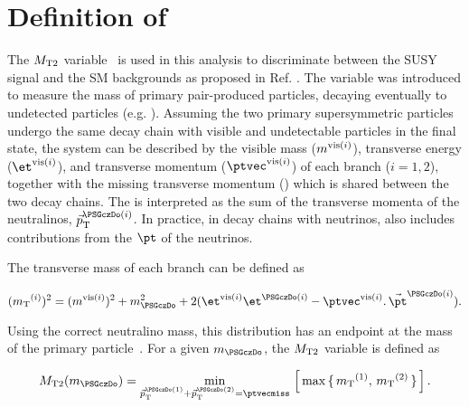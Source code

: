 \section{\texorpdfstring{Definition of \mttwo}{Definition of MT2}}
\label{sect:mt2def}
The ${M_{\rm T2}}$ variable~\cite{Lester:1999tx,Barr:2003rg} is used in this analysis to discriminate between the SUSY signal and the SM backgrounds as proposed in Ref. \cite{Barr:2009wu}. The variable was introduced to measure the mass of primary pair-produced particles, decaying eventually to undetected particles (e.g. \PSGczDo). Assuming the two primary supersymmetric particles undergo the same decay chain with visible and undetectable particles in the final state, the system can be described by the visible mass ($m^{{\rm vis}(i)}$), transverse energy ($\etvisi$), and transverse momentum ($\vptvisi$) of each branch ($i=1,2$), together with the 
missing transverse momentum (\ptvecmiss) which is shared between the two decay chains. The \ptvecmiss is interpreted as the sum of the transverse momenta
of the neutralinos, $\vec{p}_{\rm T}^{\PSGczDo(i)}$.
In practice, in decay chains with neutrinos, \ptvecmiss also includes contributions from the $\pt$ of the neutrinos.

The transverse mass of each branch can be defined as 
\begin{linenomath}
\begin{equation}
\label{eq:mtdef}
(\mt^{(i)})^{2}= (\mvisi)^2+m^2_{\PSGczDo}+2(\etvisi\et^{\PSGczDo(i)}-{\vptvisi}.\,{\vec{\pt}^{\PSGczDo(i)}}).
\end{equation}
\end{linenomath}

\noindent Using the correct neutralino mass, this distribution has an endpoint at the mass of the primary particle~\cite{Arnison:1983rp,Banner:1983jy,Affolder:2000bpa,Abazov:2002bu}. 
For a given $m_{\PSGczDo}$, the ${M_{\rm T2}}$ variable is defined as
\begin{linenomath}
\begin{equation}
\label{eq:mt2def}
\mttwo(m_{\PSGczDo})= \min_{\vec{p}_{\rm T}^{\PSGczDo(1)}+\vec{p}_{\rm T}^{\PSGczDo(2)}=\ptvecmiss}\,\left[\,\max\,\{ \, \mt^{(1)},\,\mt^{(2)}\,\}\,\right].
\end{equation}
\end{linenomath}

